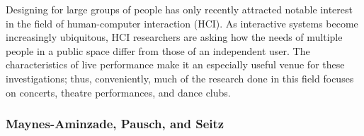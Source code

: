 Designing for large groups of people has only recently attracted notable interest in the field of human-computer interaction (HCI). As interactive systems become increasingly ubiquitous, HCI researchers are asking how the needs of multiple people in a public space differ from those of an independent user. The characteristics of live performance make it an especially useful venue for these investigations; thus, conveniently, much of the research done in this field focuses on concerts, theatre performances, and dance clubs.

\subsubsection{Maynes-Aminzade, Pausch, and Seitz}


